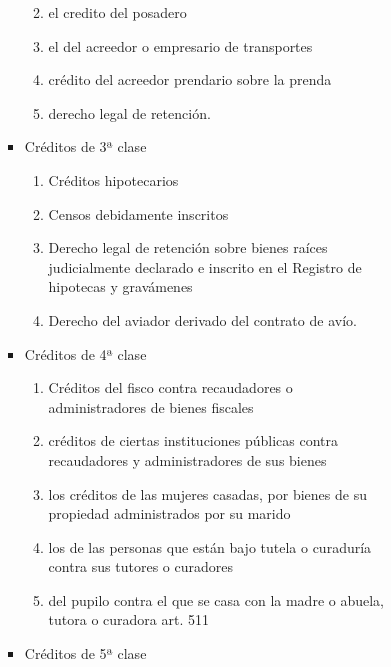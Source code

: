 \documentclass[]{article}
\providecommand{\tightlist}{%
  \setlength{\itemsep}{0pt}\setlength{\parskip}{0pt}}
\begin{document}
\begin{itemize}
\begin{itemize}
\begin{enumerate}
\begin{itemize}
\begin{itemize}
\begin{itemize}
            \begin{enumerate}
            \def\labelenumii{\arabic{enumii}.}
            \tightlist
            \item
              el credito del posadero
            \item
              el del acreedor o empresario de transportes
            \item
              crédito del acreedor prendario sobre la prenda
            \item
              derecho legal de retención.
            \end{enumerate}
          \item
            Créditos de 3ª clase

            \begin{enumerate}
            \def\labelenumii{\arabic{enumii}.}
            \tightlist
            \item
              Créditos hipotecarios
            \item
              Censos debidamente inscritos
            \item
              Derecho legal de retención sobre bienes raíces
              judicialmente declarado e inscrito en el Registro de
              hipotecas y gravámenes
            \item
              Derecho del aviador derivado del contrato de avío.
            \end{enumerate}
          \item
            Créditos de 4ª clase

            \begin{enumerate}
            \def\labelenumii{\arabic{enumii}.}
            \tightlist
            \item
              Créditos del fisco contra recaudadores o administradores
              de bienes fiscales
            \item
              créditos de ciertas instituciones públicas contra
              recaudadores y administradores de sus bienes
            \item
              los créditos de las mujeres casadas, por bienes de su
              propiedad administrados por su marido
            \item
              los de las personas que están bajo tutela o curaduría
              contra sus tutores o curadores
            \item
              del pupilo contra el que se casa con la madre o abuela,
              tutora o curadora art. 511
            \end{enumerate}
          \item
            Créditos de 5ª clase


\end{itemize}
\end{itemize}
\end{itemize}
\end{enumerate}
\end{itemize}
\end{itemize}
\end{document}
